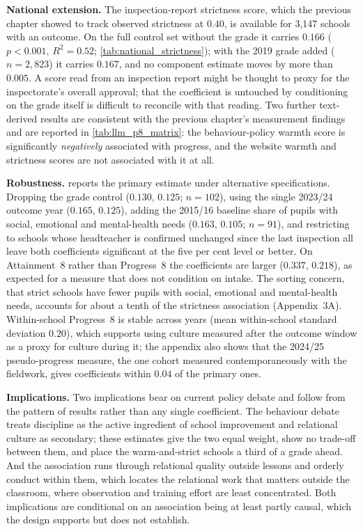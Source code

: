 \textbf{National extension.} The inspection-report strictness score, which
the previous chapter showed to track observed strictness at $0.40$, is
available for 3,147 schools with an outcome. On the full control set without
the grade it carries $0.166$ ($p < 0.001$, $R^2 = 0.52$;
\cref{tab:national_strictness}); with the 2019 grade added ($n = 2{,}823$) it
carries $0.167$, and no component estimate moves by more than $0.005$. A score
read from an inspection report might be thought to proxy for the inspectorate's
overall approval; that the coefficient is untouched by conditioning on the
grade itself is difficult to reconcile with that reading. Two further
text-derived results are consistent with the previous chapter's measurement
findings and are reported in \cref{tab:llm_p8_matrix}: the behaviour-policy
warmth score is significantly \emph{negatively} associated with progress, and
the website warmth and strictness scores are not associated with it at all.

\textbf{Robustness.}  reports the primary
estimate under alternative specifications. Dropping the grade control
($0.130$, $0.125$; $n = 102$), using the single 2023/24 outcome year ($0.165$,
$0.125$), adding the 2015/16 baseline share of pupils with social, emotional
and mental-health needs ($0.163$, $0.105$; $n = 91$), and restricting to
schools whose headteacher is confirmed unchanged since the last inspection all
leave both coefficients significant at the five per cent level or better. On
Attainment~8 rather than Progress~8 the coefficients are larger ($0.337$,
$0.218$), as expected for a measure that does not condition on intake. The
sorting concern, that strict schools have fewer pupils with social, emotional
and mental-health needs, accounts for about a tenth of the strictness
association (Appendix~3A). Within-school Progress~8 is stable across years
(mean within-school standard deviation $0.20$), which supports using culture
measured after the outcome window as a proxy for culture during it; the
appendix also shows that the 2024/25 pseudo-progress measure, the one cohort
measured contemporaneously with the fieldwork, gives coefficients within
$0.04$ of the primary ones.

\textbf{Implications.} Two implications bear on current policy debate and
follow from the pattern of results rather than any single coefficient. The
behaviour debate treats discipline as the active ingredient of school
improvement and relational culture as secondary; these estimates give the two
equal weight, show no trade-off between them, and place the warm-and-strict
schools a third of a grade ahead. And the association runs through relational
quality outside lessons and orderly conduct within them, which locates the
relational work that matters outside the classroom, where observation and
training effort are least concentrated. Both implications are conditional on
an association being at least partly causal, which the design supports but
does not establish.

